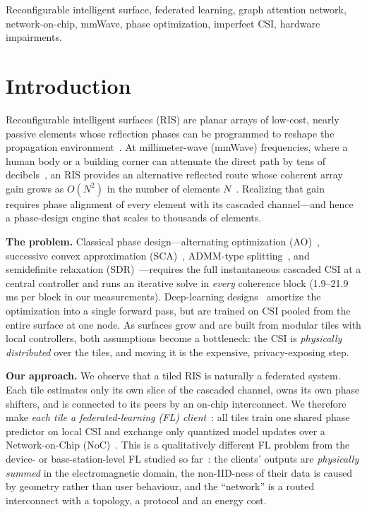 \documentclass[conference]{IEEEtran}
\begin{document}
\begin{IEEEkeywords}
Reconfigurable intelligent surface, federated learning, graph attention network, network-on-chip, mmWave, phase optimization, imperfect CSI, hardware impairments.
\end{IEEEkeywords}

\section{Introduction}
\label{sec:intro}

Reconfigurable intelligent surfaces (RIS) are planar arrays of low-cost, nearly passive elements whose reflection phases can be programmed to reshape the propagation environment~\cite{direnzo2020,basar2019,wu2020towards,liaskos2018}. At millimeter-wave (mmWave) frequencies, where a human body or a building corner can attenuate the direct path by tens of decibels~\cite{rappaport2019}, an RIS provides an alternative reflected route whose coherent array gain grows as $O(N^2)$ in the number of elements $N$~\cite{wu2019joint,bjornson2020}. Realizing that gain requires phase alignment of every element with its cascaded channel---and hence a phase-design engine that scales to thousands of elements.

\textbf{The problem.} Classical phase design---alternating optimization (AO)~\cite{wu2019joint}, successive convex approximation (SCA)~\cite{guo2020}, ADMM-type splitting~\cite{boyd2011}, and semidefinite relaxation (SDR)~\cite{luo2010}---requires the full instantaneous cascaded CSI at a central controller and runs an iterative solve in \emph{every} coherence block (1.9--21.9\,ms per block in our measurements). Deep-learning designs~\cite{huang2020drl,taha2021,shen2021gnn,zappone2019} amortize the optimization into a single forward pass, but are trained on CSI pooled from the entire surface at one node. As surfaces grow and are built from modular tiles with local controllers, both assumptions become a bottleneck: the CSI is \emph{physically distributed} over the tiles, and moving it is the expensive, privacy-exposing step.

\textbf{Our approach.} We observe that a tiled RIS is naturally a federated system. Each tile estimates only its own slice of the cascaded channel, owns its own phase shifters, and is connected to its peers by an on-chip interconnect. We therefore make \emph{each tile a federated-learning (FL) client}~\cite{mcmahan2017,kairouz2021}: all tiles train one shared phase predictor on local CSI and exchange only quantized model updates over a Network-on-Chip (NoC)~\cite{benini2002,dally2004}. This is a qualitatively different FL problem from the device- or base-station-level FL studied so far~\cite{yang2020ota,elbir2022}: the clients' outputs are \emph{physically summed} in the electromagnetic domain, the non-IID-ness of their data is caused by geometry rather than user behaviour, and the ``network'' is a routed interconnect with a topology, a protocol and an energy cost.
\end{document}
